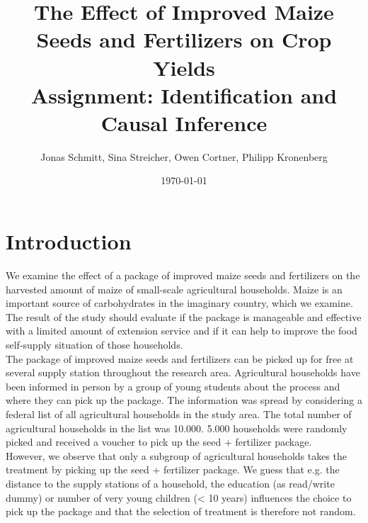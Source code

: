 



\title{\huge The Effect of Improved Maize Seeds and Fertilizers on Crop Yields \\
\LARGE Assignment: Identification and Causal Inference}

\author{Jonas Schmitt, Sina Streicher, Owen Cortner, Philipp Kronenberg}

\date{\small \today}

\clearpage\maketitle
\thispagestyle{empty}

\renewcommand{\labelenumi}{\alph{enumi})}

\section{Introduction} \label{sec:introduction}

We examine the effect of a package of improved maize seeds and fertilizers on the harvested amount of maize of small-scale agricultural households. Maize is an important source of carbohydrates in the imaginary country, which we examine. The result of the study should evaluate if the package is manageable and effective with a limited amount of extension service and if it can help to improve the food self-supply situation of those households. \\

The package of improved maize seeds and fertilizers can be picked up for free at several supply station throughout the research area. Agricultural households have been informed in person by a group of young students about the process and where they can pick up the package. The information was spread by considering a federal list of all agricultural households in the study area. The total number of agricultural households in the list was 10.000. 5.000 households were randomly picked and received a voucher to pick up the seed + fertilizer package. \\

However, we observe that only a subgroup of agricultural households takes the treatment by picking up the seed + fertilizer package. We guess that e.g. the distance to the supply stations of a household, the education (as read/write dummy) or number of very young children (< 10 years) influences the choice to pick up the package and that the selection of treatment is therefore not random. \\

